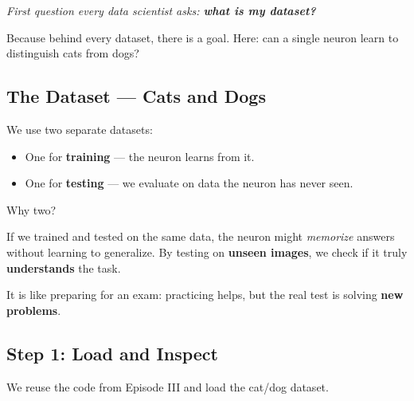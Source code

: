 \documentclass[11pt]{article}
\begin{document}
\vspace{0.7em}

\begin{center}
\textit{First question every data scientist asks: \textbf{what is my dataset?}}

Because behind every dataset, there is a goal.  
Here: can a single neuron learn to distinguish cats from dogs?
\end{center}

\vspace{0.7em}

\subsection*{The Dataset — Cats and Dogs}

\vspace{0.5em}

We use two separate datasets:
\begin{itemize}
    \item One for \textbf{training} — the neuron learns from it.
    \item One for \textbf{testing} — we evaluate on data the neuron has never seen.
\end{itemize}

\vspace{0.5em}

\noindent Why two?

\begin{tcolorbox}[colback=white!98!gray, colframe=gray!30!black, arc=1mm]
If we trained and tested on the same data, the neuron might \emph{memorize} answers without learning to generalize.  
By testing on \textbf{unseen images}, we check if it truly \textbf{understands} the task.
\end{tcolorbox}

\vspace{0.5em}

\noindent It is like preparing for an exam: practicing helps, but the real test is solving \textbf{new problems}.

\vspace{1em}

\subsection*{Step 1: Load and Inspect}

\begin{tcolorbox}[colback=gray!3, colframe=black!40, title=Step 1: Load the Neuron and the Data, fonttitle=\bfseries, arc=2mm]
We reuse the code from Episode III and load the cat/dog dataset.
\end{tcolorbox}
\end{document}
